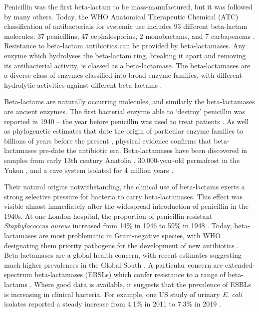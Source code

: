 \documentclass[aps,rmp,preprint,superscriptaddress,10pt,twocolumn]{revtex4-1}
\begin{document}
Penicillin was the first beta-lactam to be mass-manufactured, but it was followed by many others. Today, the WHO Anatomical Therapeutic Chemical (ATC) classification of antibacterials for systemic use includes 93 different beta-lactam molecules: 37 penicillins, 47 cephalosporins, 2 monobactams, and 7 carbapenems \cite{WHO_ATC}. Resistance to beta-lactam antibiotics can be provided by beta-lactamases. Any enzyme which hydrolyses the beta-lactam ring, breaking it apart and removing its antibacterial activity, is classed as a beta-lactamase. The beta-lactamases are a diverse class of enzymes classified into broad enzyme families, with different hydrolytic activities against different beta-lactams \cite{Bush2016}.\par 

Beta-lactams are naturally occurring molecules, and similarly the beta-lactamases are ancient enzymes. The first bacterial enzyme able to `destroy' penicillin was reported in 1940 {--} the year before penicillin was used to treat patients \cite{Abraham1940}. As well as phylogenetic estimates that date the origin of particular enzyme families to billions of years before the present \cite{Barlow2002, Hall2004}, physical evidence confirms that beta-lactamases pre-date the antibiotic era. Beta-lactamases have been discovered in samples from early 13th century Anatolia \cite{Devault2017}, 30,000-year-old permafrost in the Yukon \cite{Dcosta2011}, and a cave system isolated for 4 million years \cite{Bhullar2012}. 

Their natural origins notwithstanding, the clinical use of beta-lactams exerts a strong selective pressure for bacteria to carry beta-lactamases. This effect was visible almost immediately after the widespread introduction of penicillin in the 1940s. At one London hospital, the proportion of penicillin-resistant \textit{Staphylococcus aureus} increased from 14\% in 1946 to 59\% in 1948 \cite{Barber1949}. Today, beta-lactamases are most problematic in Gram-negative species\cite{Bush2020}, with WHO designating them priority pathogens for the development of new antibiotics \cite{WHO2017}. Beta-lactamases are a global health concern, with recent estimates suggesting much higher prevalences in the Global South \cite{Global2022}. A particular concern are extended-spectrum beta-lactamases (EBSLs) which confer resistance to a range of beta-lactams \cite{Livermore2008}. Where good data is available, it suggests that the prevalence of ESBLs is increasing in clinical bacteria. For example, one US study of urinary \textit{E. coli} isolates reported a steady increase from 4.1\% in 2011 to 7.3\% in 2019 \cite{Kaye2021}. \par
\end{document}
